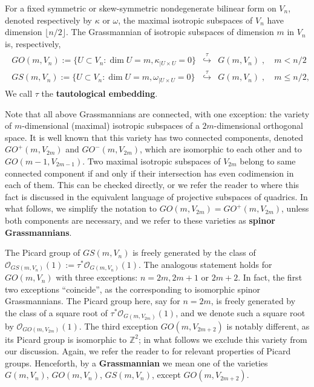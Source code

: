 \documentclass[12pt]{amsart}
\def\ZZ {{\mathbb Z}}     %
\def\mc {\mathcal}
\begin{document}
For a fixed symmetric or skew-symmetric nondegenerate bilinear form on $V_n$, denoted respectively by $\kappa$ or $\omega$, the maximal isotropic subspaces of $V_{n}$ have dimension $\lfloor n/2 \rfloor$. The Grassmannian of isotropic subspaces of dimension $m$ in $V_n$ is, respectively,
\begin{gather*}
\begin{array}{lcl}
GO(m,V_{n}):=\{ U\subset V_n : \dim U= m, \kappa_{\vert U\times U}=0\} & \stackrel{\tau}{\hookrightarrow} & G(m,V_n) \;,\quad m < n/2\\
GS(m,V_{n}):=\{ U\subset V_n : \dim U= m, \omega_{\vert U\times U}=0\} & \stackrel{\tau}{\hookrightarrow} & G(m,V_n) \;,\quad m\leq n/2,
\end{array}
\end{gather*}
We call $\tau$ the {\bf tautological embedding}.

Note that all above Grassmannians are connected, with one exception: the variety of $m$-dimensional (maximal) isotropic subspaces of a $2m$-dimensional orthogonal space. It is well known that this variety has two connected components, denoted $GO^+(m,V_{2m})$ and $GO^-(m,V_{2m})$, which are isomorphic to each other and to $GO(m-1,V_{2m-1})$. Two maximal isotropic subspaces of $V_{2m}$ belong to same connected component if and only if their intersection has even codimension in each of them. This can be checked directly, or we refer the reader to \cite{Tits} where this fact is discussed in the equivalent language of projective subspaces of quadrics. In what follows, we simplify the notation to $GO(m,V_{2m})=GO^+(m,V_{2m})$, unless both components are necessary, and we refer to these varieties as {\bf spinor Grassmannians}.

The Picard group of $GS(m,V_n)$ is freely generated by the class of $\mc O_{GS(m,V_{n})}(1):=\tau^*\mc O_{G(m,V_{n})}(1)$. The analogous statement holds for $GO(m,V_n)$ with three exceptions: $n=2m,2m+1$ or $2m+2$. In fact, the first two exceptions ``coincide'', as the corresponding to isomorphic spinor Grassmannians. The Picard group here, say for $n=2m$, is freely generated by the class of a square root of $\tau^*\mc O_{G(m,V_{2m})}(1)$, and we denote such a square root by $\mc O_{GO(m,V_{2m})}(1)$. The third exception $GO(m,V_{2m+2})$ is notably different, as its Picard group is isomorphic to $\ZZ^2$; in what follows we exclude this variety from our discussion. Again, we refer the reader to \cite{KKV} for relevant properties of Picard groups. Henceforth, by a {\bf Grassmannian} we mean one of the varieties $G(m,V_n)$, $GO(m,V_n)$, $GS(m,V_n)$, except $GO(m,V_{2m+2})$.
\end{document}
